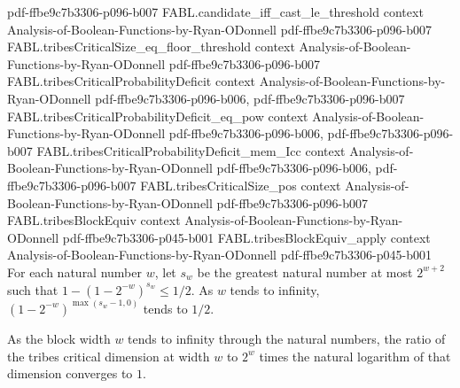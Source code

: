 \begin{theorem}
  {pdf-ffbe9c7b3306-p096-b007}
\proofstep
  {FABL.candidate_iff_cast_le_threshold}
  {context}
  {Analysis-of-Boolean-Functions-by-Ryan-ODonnell}
  {pdf-ffbe9c7b3306-p096-b007}
\proofstep
  {FABL.tribesCriticalSize_eq_floor_threshold}
  {context}
  {Analysis-of-Boolean-Functions-by-Ryan-ODonnell}
  {pdf-ffbe9c7b3306-p096-b007}
\proofstep
  {FABL.tribesCriticalProbabilityDeficit}
  {context}
  {Analysis-of-Boolean-Functions-by-Ryan-ODonnell}
  {pdf-ffbe9c7b3306-p096-b006,
    pdf-ffbe9c7b3306-p096-b007}
\proofstep
  {FABL.tribesCriticalProbabilityDeficit_eq_pow}
  {context}
  {Analysis-of-Boolean-Functions-by-Ryan-ODonnell}
  {pdf-ffbe9c7b3306-p096-b006,
    pdf-ffbe9c7b3306-p096-b007}
\proofstep
  {FABL.tribesCriticalProbabilityDeficit_mem_Icc}
  {context}
  {Analysis-of-Boolean-Functions-by-Ryan-ODonnell}
  {pdf-ffbe9c7b3306-p096-b006,
    pdf-ffbe9c7b3306-p096-b007}
\proofstep
  {FABL.tribesCriticalSize_pos}
  {context}
  {Analysis-of-Boolean-Functions-by-Ryan-ODonnell}
  {pdf-ffbe9c7b3306-p096-b007}
\proofstep
  {FABL.tribesBlockEquiv}
  {context}
  {Analysis-of-Boolean-Functions-by-Ryan-ODonnell}
  {pdf-ffbe9c7b3306-p045-b001}
\proofstep
  {FABL.tribesBlockEquiv_apply}
  {context}
  {Analysis-of-Boolean-Functions-by-Ryan-ODonnell}
  {pdf-ffbe9c7b3306-p045-b001}
For each natural number $w$, let $s_w$ be the greatest natural number at most $2^{w+2}$
such that $1-(1-2^{-w})^{s_w}\le 1/2$. As $w$ tends to infinity,
$(1-2^{-w})^{\max(s_w-1,0)}$ tends to $1/2$.
\end{theorem}

\begin{theorem}
\label{FABL.tendsto_dimension_div_two_pow_mul_log}
\leanok
{}
As the block width $w$ tends to infinity through the natural numbers, the ratio of the
tribes critical dimension at width $w$ to $2^w$ times the natural logarithm of that
dimension converges to $1$.
\end{theorem}

